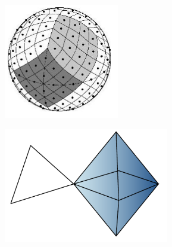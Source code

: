 \documentclass[landscape,a0paper,blockverticalspace = 7mm]{tikzposter}
\begin{document}
\begin{columns}
{{\begin{center}
\begin{minipage}{0.1\linewidth}
\begin{center}
		        
         \end{center}
      \end{minipage} \hspace{0cm}
	\begin{minipage}{0.2\linewidth}
	\begin{center}
          \includegraphics[height=5cm]{figures/sphere.png}
          
        
          \end{center}
      \end{minipage} 
   \begin{minipage}{0.1\linewidth}
      \begin{center}
      
		        
         \end{center}
      \end{minipage} \hspace{0cm}
	\begin{minipage}{0.2\linewidth}
	\begin{center}
          \includegraphics[height=5cm]{figures/high-order.pdf}
          

\end{center}
\end{minipage}
\end{center}}}
\end{columns}
\end{document}
